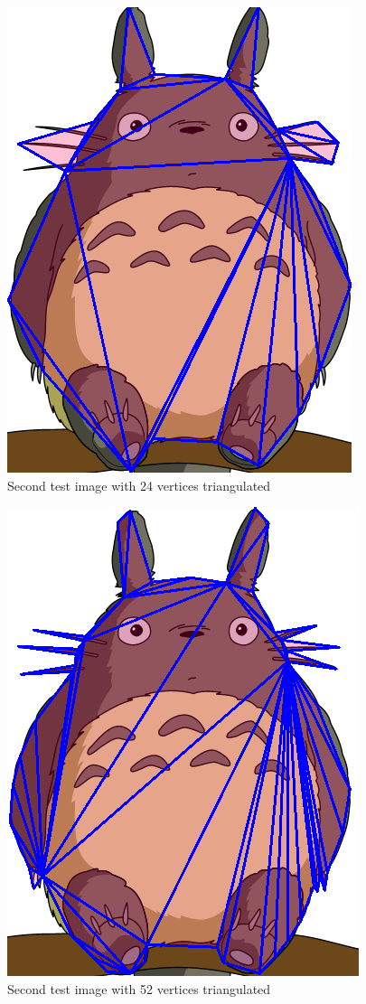 \documentclass[conference]{IEEEtran}
\begin{document}
\begin{figure}
    \centering
    \includegraphics[scale=0.3]{totoro24Triangulated}
    \caption{Second test image with 24 vertices triangulated}
\end{figure}
\begin{figure}
    \centering
    \includegraphics[scale=0.3]{totoro52Triangulated}
    \caption{Second test image with 52 vertices triangulated}
\end{figure}
\end{document}
